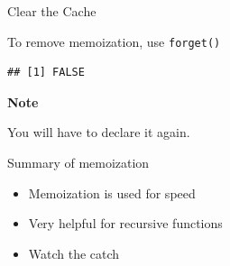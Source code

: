 \begin{frame}[fragile]{Clear the Cache}

To remove memoization, use \texttt{forget()}

\begin{Shaded}
\begin{Highlighting}[]
\NormalTok{(}\NormalTok{(}\NormalTok{))}
\end{Highlighting}
\end{Shaded}

\begin{verbatim}
## [1] FALSE
\end{verbatim}

\textbf{Note}

You will have to declare it again.

\end{frame}

\begin{frame}{Summary of memoization}

\begin{itemize}
\tightlist
\item
  Memoization is used for speed
\item
  Very helpful for recursive functions
\item
  Watch the catch
\end{itemize}

\end{frame}
